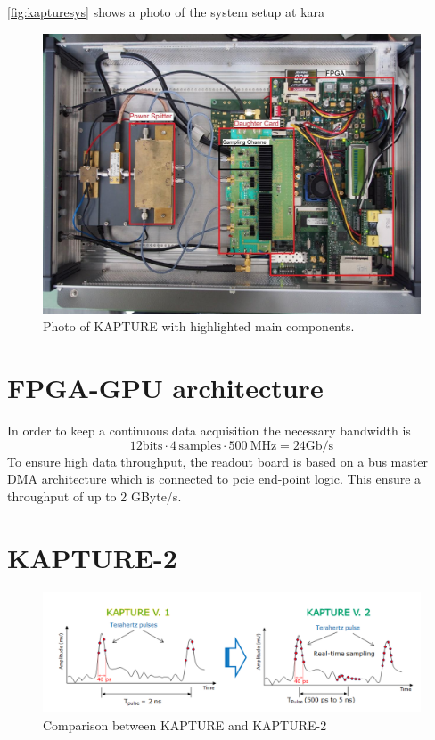 \autoref{fig:kapturesys} shows a photo of the system setup at \gls{kara}
\begin{figure}[tbh]
	\centering
	\includegraphics[width = \textwidth]{chap/03-currentStat/img/kapture_sys}
	\caption{Photo of KAPTURE with highlighted main components. \cite[p.~61]{brosi}}
	\label{fig:kapturesys}
\end{figure}

\section{FPGA-GPU architecture}

In order to keep a continuous data acquisition the necessary bandwidth is 
\begin{equation}
	12 \text{bits} \cdot 4 \, \text{samples} \cdot \SI{500}{\mega \hertz} = 24 \text{Gb/s}
\end{equation}
To ensure high data throughput, the readout board is based on a bus master DMA architecture which is connected to \gls{pcie} end-point logic. This ensure a throughput of up to 2 GByte/s. \cite{caselleKAP}

\section{KAPTURE-2}

\begin{figure}[tbh]
	\centering
	\includegraphics[width = \textwidth]{chap/03-currentStat/img/kap1_vs_kap2}
	\caption{Comparison between KAPTURE and KAPTURE-2\cite{caselleKAP}}
	\label{fig:kap1vskap2}
\end{figure}

